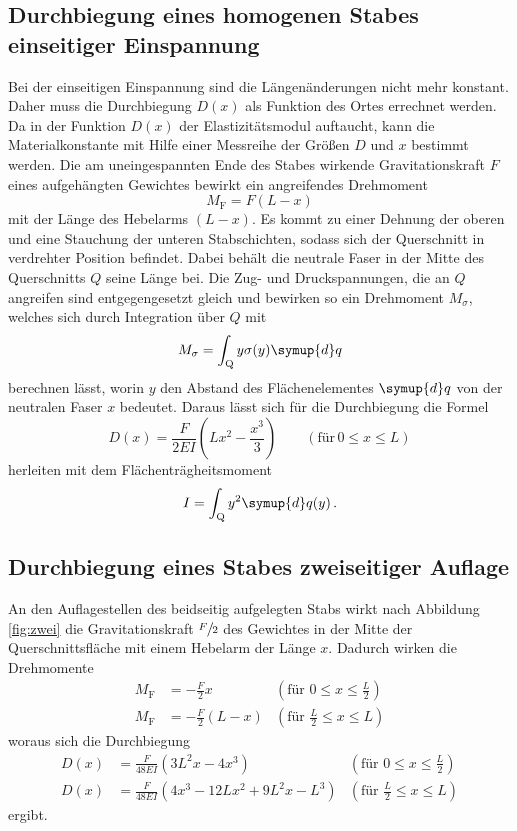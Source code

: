 \subsection{Durchbiegung eines homogenen Stabes einseitiger Einspannung}
Bei der einseitigen Einspannung sind die Längenänderungen nicht mehr konstant. Daher muss die Durchbiegung $D(x)$ als Funktion des Ortes errechnet werden.
Da in der Funktion $D(x)$ der Elastizitätsmodul auftaucht, kann die Materialkonstante mit Hilfe einer Messreihe der Größen $D$ und $x$ bestimmt werden.
Die am uneingespannten Ende des Stabes wirkende Gravitationskraft $F$ eines aufgehängten Gewichtes bewirkt ein angreifendes Drehmoment
\begin{equation}
    M_\text{F}=F \left(L-x\right)
\end{equation}
mit der Länge des Hebelarms $\left(L-x\right)$. Es kommt zu einer Dehnung der oberen und eine Stauchung der unteren Stabschichten, sodass sich der Querschnitt in verdrehter Position befindet.
Dabei behält die neutrale Faser in der Mitte des Querschnitts $Q$ seine Länge bei. Die Zug- und Druckspannungen, die an $Q$ angreifen sind entgegengesetzt gleich und bewirken so ein Drehmoment $M_\sigma$, welches sich
durch Integration über $Q$ mit 
\begin{equation}
    M_\sigma=\int_\text{Q} y\sigma (y) \symup{d}q
\end{equation}
berechnen lässt, worin $y$ den Abstand des Flächenelementes $\symup{d}q$ von der neutralen Faser $x$ bedeutet. Daraus lässt sich für die Durchbiegung die Formel
\begin{equation}
    D(x)=\frac{F}{2 E I}\left(L x^2 - \frac{x^3}{3}\right)  \qquad (\text{für} \, 0 \leq x \leq L)
    \label{eqn:deins}
\end{equation}
herleiten mit dem Flächenträgheitsmoment
\begin{equation}
    I=\int_\text{Q} y^2 \symup{d}q(y) \, .
    \label{eqn:fltm}
\end{equation}
\subsection{Durchbiegung eines Stabes zweiseitiger Auflage}
An den Auflagestellen des beidseitig aufgelegten Stabs wirkt nach Abbildung \ref{fig:zwei} die Gravitationskraft $\sfrac{F}{2}$ des Gewichtes in der Mitte der Querschnittsfläche mit einem 
Hebelarm der Länge $x$. Dadurch wirken die Drehmomente
\begin{align}
    M_\text{F}& = - \frac{F}{2} x   & \left(\text{für}\,\, 0 \leq x \leq \frac{L}{2}\right) \\
    M_\text{F}& =-\frac{F}{2}(L-x)  & \left(\text{für}\, \,\frac{L}{2} \leq x \leq L \right)
\end{align}
woraus sich die Durchbiegung
\begin{align}
    D(x)&= \frac{F}{48 E I} \left(3 L^2 x - 4 x^3 \right) & \left(\text{für}\,\, 0 \leq x \leq \frac{L}{2}\right) \\
    D(x)&= \frac{F}{48 E I} \left(4x^3 -12 L x^2 + 9 L^2 x - L^3\right) & \left(\text{für}\, \,\frac{L}{2} \leq x \leq L \right)
\end{align}
ergibt.